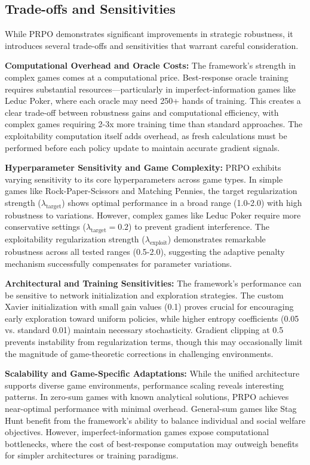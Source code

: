 \documentclass[sigconf,anonymous]{aamas}
\begin{document}
\subsection{Trade-offs and Sensitivities}

While PRPO demonstrates significant improvements in strategic robustness, it introduces several trade-offs and sensitivities that warrant careful consideration.

\textbf{Computational Overhead and Oracle Costs:} The framework's strength in complex games comes at a computational price. Best-response oracle training requires substantial resources—particularly in imperfect-information games like Leduc Poker, where each oracle may need 250+ hands of training. This creates a clear trade-off between robustness gains and computational efficiency, with complex games requiring 2-3x more training time than standard approaches. The exploitability computation itself adds overhead, as fresh calculations must be performed before each policy update to maintain accurate gradient signals.

\textbf{Hyperparameter Sensitivity and Game Complexity:} PRPO exhibits varying sensitivity to its core hyperparameters across game types. In simple games like Rock-Paper-Scissors and Matching Pennies, the target regularization strength (\(\lambda_{\text{target}}\)) shows optimal performance in a broad range (1.0-2.0) with high robustness to variations. However, complex games like Leduc Poker require more conservative settings (\(\lambda_{\text{target}} = 0.2\)) to prevent gradient interference. The exploitability regularization strength (\(\lambda_{\text{exploit}}\)) demonstrates remarkable robustness across all tested ranges (0.5-2.0), suggesting the adaptive penalty mechanism successfully compensates for parameter variations.

\textbf{Architectural and Training Sensitivities:} The framework's performance can be sensitive to network initialization and exploration strategies. The custom Xavier initialization with small gain values (0.1) proves crucial for encouraging early exploration toward uniform policies, while higher entropy coefficients (0.05 vs. standard 0.01) maintain necessary stochasticity. Gradient clipping at 0.5 prevents instability from regularization terms, though this may occasionally limit the magnitude of game-theoretic corrections in challenging environments.

\textbf{Scalability and Game-Specific Adaptations:} While the unified architecture supports diverse game environments, performance scaling reveals interesting patterns. In zero-sum games with known analytical solutions, PRPO achieves near-optimal performance with minimal overhead. General-sum games like Stag Hunt benefit from the framework's ability to balance individual and social welfare objectives. However, imperfect-information games expose computational bottlenecks, where the cost of best-response computation may outweigh benefits for simpler architectures or training paradigms.
\end{document}
